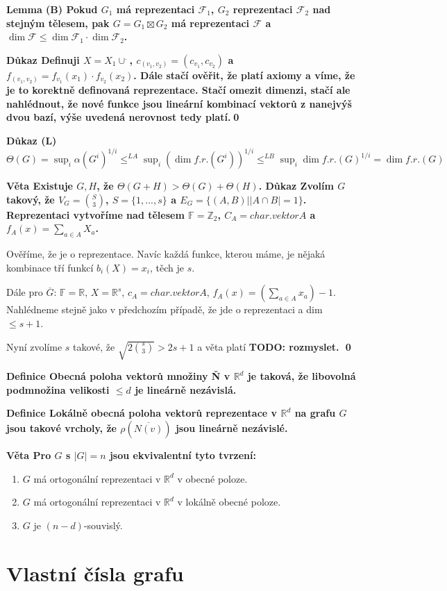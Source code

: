 \documentclass[a4paper,12pt,titlepage]{article}
\newcommand{\shn}{\Theta}
\newcommand{\lm}{\smallskip\noindent\bf Lemma\rm{} }
\newcommand{\dk}{\smallskip\noindent\bf Důkaz\rm{} }
\newcommand{\df}{\smallskip\noindent\bf Definice\rm{} }
\newcommand{\vt}{\smallskip\noindent\bf Věta\rm{} }
\newcommand{\F}{\mathcal{F}}
\newcommand{\Fr}{\mathbb{F}}
\newcommand{\Z}{\mathbb{Z}}
\newcommand{\R}{\mathbb{R}}
\newcommand{\todo}[1]{\bf TODO: \rm#1}
\begin{document}
\lm(B) Pokud $G_1$ má reprezentaci $\F_1$, $G_2$ reprezentaci $\F_2$ nad stejným tělesem, pak $G = G_1 \boxtimes G_2$ má reprezentaci $\F$ a $\dim\F \leq \dim\F_1 \cdot \dim\F_2$.

\dk Definuji $X = X_1 \cup^.$, $c_(v_1,v_2) = (c_{v_1}, c_{v_2})$ a $f_(v_1, v_2) = f_{v_1}(x_1) \cdot f_{v_2}(x_2)$.
Dále stačí ověřit, že platí axiomy a víme, že je to korektně definovaná reprezentace. Stačí omezit dimenzi, stačí ale nahlédnout, že nové funkce jsou lineární kombinací vektorů z nanejvýš dvou bazí, výše uvedená nerovnost tedy platí.\qed

\dk(L) $\shn(G) = \sup_i \alpha(G^i)^{1/i} \leq^{LA} \sup_i(\dim f.r.(G^i))^{1/i} \leq^{LB} \sup_i\dim f.r. (G)^{1/i} = \dim f.r.(G)$

\vt Existuje $G, H$, že $\shn(G+H) > \shn(G) + \shn(H)$.
\dk Zvolím $G$ takový, že $V_G=\binom{S}{3}$, $S = \{1, ..., s\}$ a $E_G = \{ (A, B) | |A\cap B| = 1\}$. Reprezentaci vytvoříme nad tělesem $\Fr = \Z_2$, $C_A = char. vektor A$ a $f_A(x) = \sum_{a\in A} X_a$.

Ověříme, že je o reprezentace. Navíc každá funkce, kterou máme, je nějaká kombinace tří funkcí $b_i(X) = x_i$, těch je $s$.

Dále pro $\overline G$: $\Fr = \R$, $X = \R^s$, $c_A = char. vektor A$, $f_A(x) = \left(\sum_{a\in A} x_a\right) -1$. Nahlédneme stejně jako v předchozím případě, že jde o reprezentaci a dim $\leq s+1$.

Nyní zvolíme $s$ takové, že $\sqrt{2\binom{s}{3}} > 2s + 1$ a věta platí \todo{rozmyslet}. \qed

\df Obecná poloha vektorů množiny \v N v  $\R^d$ je taková, že libovolná podmnožina velikosti $\leq d$ je lineárně nezávislá.

\df Lokálně obecná poloha vektorů reprezentace v $\R^d$ na grafu $G$ jsou takové vrcholy, že $\rho(\overline{N(v)})$ jsou lineárně nezávislé.

\vt Pro $G$ s $|G| = n$ jsou ekvivalentní tyto tvrzení:
\begin{enumerate}
	\item $G$ má ortogonální reprezentaci v $\R^d$ v obecné poloze.
	\item $G$ má ortogonální reprezentaci v $\R^d$ v lokálně obecné poloze.
	\item $G$ je $(n-d)$-souvislý.
\end{enumerate}


\section{Vlastní čísla grafu}
\end{document}
